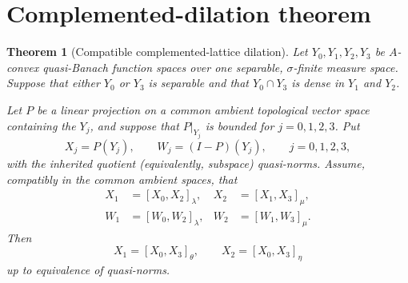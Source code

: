 \documentclass[11pt]{article}
\newtheorem{theorem}{Theorem}
\begin{document}
\section*{Complemented-dilation theorem}

\begin{theorem}[Compatible complemented-lattice dilation]
\label{thm:dilation}
Let $Y_0,Y_1,Y_2,Y_3$ be $A$-convex quasi-Banach function spaces over one
separable, $\sigma$-finite measure space.  Suppose that either $Y_0$ or $Y_3$
is separable and that $Y_0\cap Y_3$ is dense in $Y_1$ and $Y_2$.

Let $P$ be a linear projection on a common ambient topological vector space
containing the $Y_j$, and suppose that $P|_{Y_j}$ is bounded for
$j=0,1,2,3$.  Put
\[
 X_j=P(Y_j),\qquad W_j=(I-P)(Y_j),\qquad j=0,1,2,3,
\]
with the inherited quotient (equivalently, subspace) quasi-norms.  Assume,
compatibly in the common ambient spaces, that
\begin{align}
 X_1&=[X_0,X_2]_\lambda,& X_2&=[X_1,X_3]_\mu,
 \label{eq:xlocal}\\
 W_1&=[W_0,W_2]_\lambda,& W_2&=[W_1,W_3]_\mu.
 \label{eq:wlocal}
\end{align}
Then
\begin{equation}\label{eq:conclusion}
 X_1=[X_0,X_3]_\theta,\qquad X_2=[X_0,X_3]_\eta
\end{equation}
up to equivalence of quasi-norms.
\end{theorem}
\end{document}
